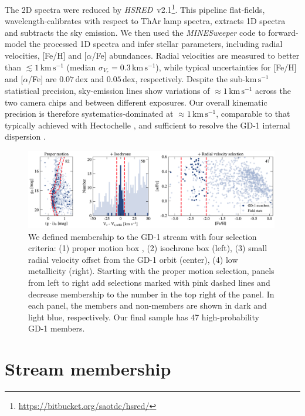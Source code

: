 \documentclass[twocolumn]{aastex63}
\newcommand{\package}[1]{\textsl{#1}}
\newcommand{\kms}{\ensuremath{\textrm{km}\,\textrm{s}^{-1}}}
\begin{document}
The 2D spectra were reduced by \package{HSRED}~v2.1\footnote{\url{https://bitbucket.org/saotdc/hsred/}}.
This pipeline flat-fields, wavelength-calibrates with respect to ThAr lamp spectra, extracts 1D spectra and subtracts the sky emission.
We then used the \package{MINESweeper} code \citep{cargile2019} to forward-model the processed 1D spectra and infer stellar parameters, including radial velocities, [Fe/H] and [$\alpha$/Fe] abundances.
Radial velocities are measured to better than $\lesssim1\,\kms$ (median $\sigma_{V_r}=0.3\,\kms$), while typical uncertainties for [Fe/H] and [$\alpha$/Fe] are $0.07$\,dex and $0.05$\,dex, respectively.
Despite the sub-$\kms$ statistical precision, sky-emission lines show variations of $\approx1\,\kms$ across the two camera chips and between different exposures.
Our overall kinematic precision is therefore systematics-dominated at $\approx1\,\kms$, comparable to that typically achieved with Hectochelle \citep[e.g.,][]{caldwell2017}, and sufficient to resolve the GD-1 internal dispersion \citep{malhan2019}.

\begin{figure}
\begin{center}
\includegraphics[width=0.99\textwidth]{members.pdf}
\end{center}
\caption{We defined membership to the GD-1 stream with four selection criteria: (1) proper motion box \citep[from][not shown]{pwb}, (2) isochrone box (left), (3) small radial velocity offset from the GD-1 orbit (center), (4) low metallicity (right).
Starting with the proper motion selection, panels from left to right add selections marked with pink dashed lines and decrease membership to the number in the top right of the panel.
In each panel, the members and non-members are shown in dark and light blue, respectively.
Our final sample has 47 high-probability GD-1 members.
}
\label{fig:members}
\end{figure}

\section{Stream membership}
\label{sec:membership}
\end{document}
